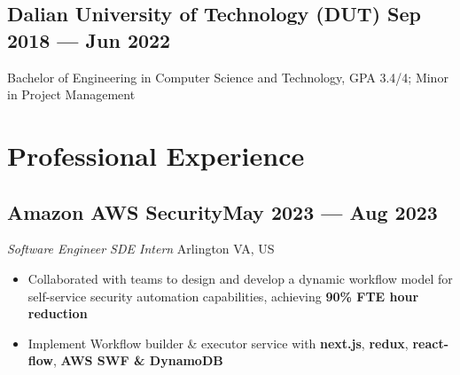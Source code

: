 \documentclass[a4,12pt]{article}
\newcommand{\subtext}[1]{
#1\par\vspace{-0.3cm}}
\newenvironment{zitemize}{
\begin{itemize}\itemsep0pt \parskip0pt \parsep1pt}
{\end{itemize}\vspace{-0.5cm}}
\begin{document}
\vspace{-0.4cm}
\subsection*{Dalian University of Technology (DUT) \hfill \textbf{Sep 2018 --- Jun 2022}}
Bachelor of Engineering in Computer Science and Technology, GPA 3.4/4; Minor in Project Management




\vspace{-0.5cm}


\section{\textbf{Professional Experience}}
        
\vspace{-0.15cm}


\subsection*{\normalsize\textbf{Amazon AWS Security}\hfill May 2023 --- Aug 2023 } 
\subtext{\textit{Software Engineer SDE Intern} \hfill Arlington VA, US} 
    \begin{zitemize}
        \item Collaborated with teams to design and develop a dynamic workflow model for self-service security automation capabilities, achieving \textbf{90\% FTE hour reduction}
        \item Implement Workflow builder \& executor service with \textbf{next.js}, \textbf{redux}, \textbf{react-flow}, \textbf{AWS SWF \& DynamoDB}
    \end{zitemize}

\vspace{-0.1cm}

\end{document}
